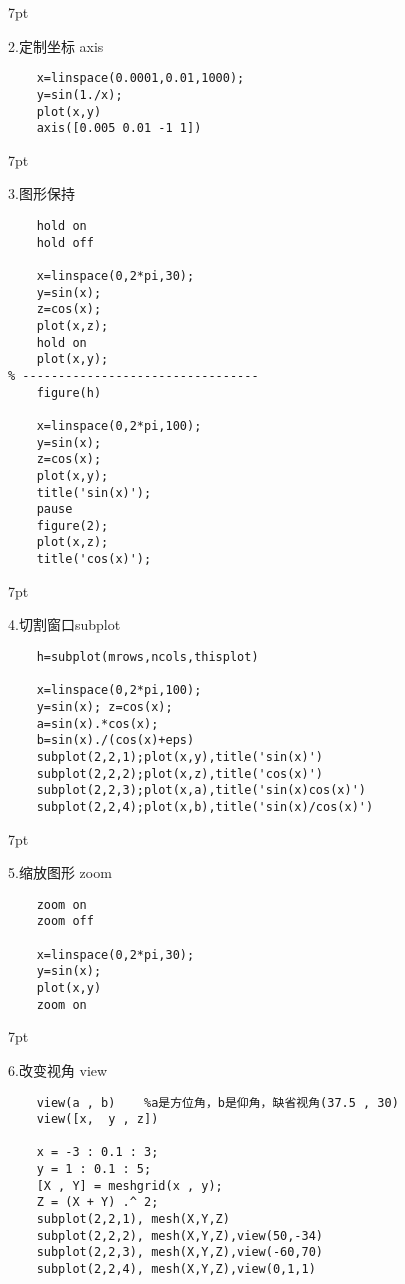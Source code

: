 \documentclass{article} %
\newenvironment{eg}{%
\def\FrameCommand{%
\hspace{1pt}%
{\color{Gray}\vrule width 2pt}%
{\color{egshade}\vrule width 4pt}%
\colorbox{egshade}%
}%
\MakeFramed{\advance\hsize-\width\FrameRestore}%
\noindent\hspace{-4.55pt}%
\begin{adjustwidth}{}{7pt}%
\vspace{2pt}\vspace{2pt}%
\normalfont %
}
{%
\vspace{2pt}\end{adjustwidth}\endMakeFramed%
}
\begin{document}
\begin{eg}
    2.定制坐标 axis
\end{eg}
\begin{lstlisting}
    x=linspace(0.0001,0.01,1000); 
    y=sin(1./x); 
    plot(x,y) 
    axis([0.005 0.01 -1 1]) 
\end{lstlisting}

\begin{eg}
    3.图形保持
\end{eg}
\begin{lstlisting}
    hold on 
    hold off

    x=linspace(0,2*pi,30); 
    y=sin(x); 
    z=cos(x);
    plot(x,z);
    hold on 
    plot(x,y);
% ---------------------------------
    figure(h)
   
    x=linspace(0,2*pi,100); 
    y=sin(x);
    z=cos(x); 
    plot(x,y); 
    title('sin(x)'); 
    pause 
    figure(2); 
    plot(x,z); 
    title('cos(x)');

\end{lstlisting}

\begin{eg}
    4.切割窗口subplot
\end{eg}
\begin{lstlisting}
    h=subplot(mrows,ncols,thisplot) 

    x=linspace(0,2*pi,100); 
    y=sin(x); z=cos(x);   
    a=sin(x).*cos(x);
    b=sin(x)./(cos(x)+eps) 
    subplot(2,2,1);plot(x,y),title('sin(x)') 
    subplot(2,2,2);plot(x,z),title('cos(x)') 
    subplot(2,2,3);plot(x,a),title('sin(x)cos(x)') 
    subplot(2,2,4);plot(x,b),title('sin(x)/cos(x)')
\end{lstlisting}

\begin{eg}
    5.缩放图形 zoom 
\end{eg}
\begin{lstlisting}
    zoom on
    zoom off

    x=linspace(0,2*pi,30); 
    y=sin(x); 
    plot(x,y) 
    zoom on
\end{lstlisting}

\begin{eg}
    6.改变视角 view
\end{eg}
\begin{lstlisting}
    view(a , b)    %a是方位角，b是仰角，缺省视角(37.5 , 30)
    view([x,  y , z])

    x = -3 : 0.1 : 3;   
    y = 1 : 0.1 : 5; 
    [X , Y] = meshgrid(x , y); 
    Z = (X + Y) .^ 2; 
    subplot(2,2,1), mesh(X,Y,Z) 
    subplot(2,2,2), mesh(X,Y,Z),view(50,-34) 
    subplot(2,2,3), mesh(X,Y,Z),view(-60,70) 
    subplot(2,2,4), mesh(X,Y,Z),view(0,1,1) 
\end{lstlisting}
\end{document}
